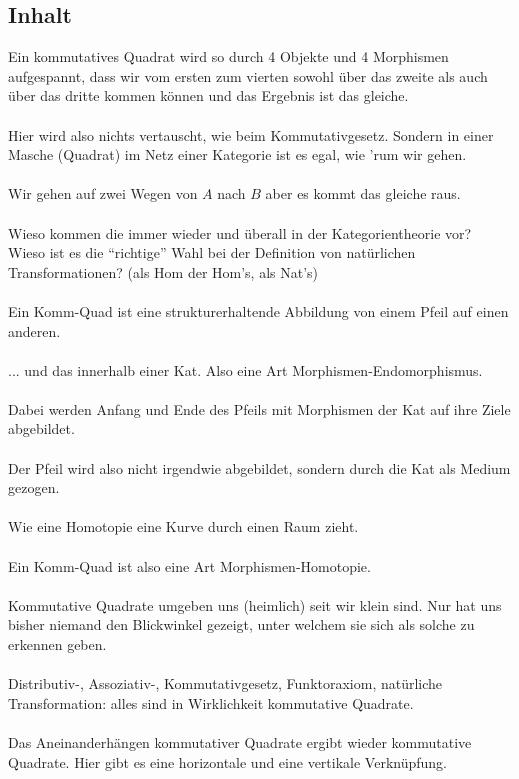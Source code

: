 \documentclass[a4paper]{amsart}
\theoremstyle{definition}
\begin{document}
\subsection*{Inhalt}
Ein kommutatives Quadrat wird so durch 4 Objekte und 4 Morphismen aufgespannt, dass wir vom ersten zum vierten sowohl über das zweite als auch über das dritte kommen können und das Ergebnis ist das gleiche.
\\\\
Hier wird also nichts vertauscht, wie beim Kommutativgesetz. Sondern in einer Masche (Quadrat) im Netz einer Kategorie ist es egal, wie 'rum wir gehen.
\\\\
Wir gehen auf zwei Wegen von $A$ nach $B$ aber es kommt das gleiche raus.
\\\\
Wieso kommen die immer wieder und überall in der Kategorientheorie vor? Wieso ist es die "`richtige"' Wahl bei der Definition von natürlichen Transformationen? (als Hom der Hom's, als Nat's)
\\\\
Ein Komm-Quad ist eine strukturerhaltende Abbildung von einem Pfeil auf einen anderen.
\\\\
... und das innerhalb einer Kat. Also eine Art Morphismen-Endomorphismus.
\\\\
Dabei werden Anfang und Ende des Pfeils mit Morphismen der Kat auf ihre Ziele abgebildet.
\\\\
Der Pfeil wird also nicht irgendwie abgebildet, sondern durch die Kat als Medium gezogen.
\\\\
Wie eine Homotopie eine Kurve durch einen Raum zieht.
\\\\
Ein Komm-Quad ist also eine Art Morphismen-Homotopie.
\\\\
Kommutative Quadrate umgeben uns (heimlich) seit wir klein sind. Nur hat uns bisher niemand den Blickwinkel gezeigt, unter welchem sie sich als solche zu erkennen geben.
\\\\
Distributiv-, Assoziativ-, Kommutativgesetz, Funktoraxiom, natürliche Transformation: alles sind
in Wirklichkeit kommutative Quadrate.
\\\\
Das Aneinanderhängen kommutativer Quadrate ergibt wieder kommutative Quadrate. Hier gibt es eine horizontale und eine vertikale Verknüpfung.
\end{document}
